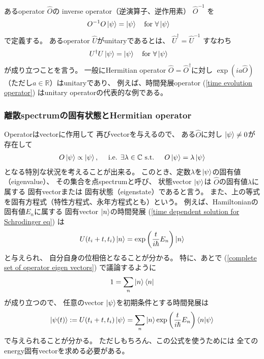 あるoperator $\hat{O}$の
inverse operator（逆演算子、逆作用素）
$\hat{O}^{-1}$
を
\begin{align}
    O^{-1} O \ket{\psi} &= \ket{\psi}
    \quad\text{for $\forall \ket{\psi}$}
\end{align}
で定義する。
あるoperator $\hat{U}$がunitaryであるとは、
$ \hat{U}^\dagger = \hat{U}^{-1} $
すなわち
\begin{align}
    U^\dagger U \ket{\psi} &= \ket{\psi}
    \quad\text{for $\forall \ket{\psi}$}
\label{unitary operator}
\end{align}
が成り立つことを言う。
一般にHermitian operator $\hat{O} = \hat{O}^\dagger$に対し
$\exp( i a \hat{O})$（ただし$a \in \mathbb{R}$）はunitaryであり、
例えば、時間発展operator
(\ref{time evolution operator})
はunitary operatorの代表的な例である。

\subsubsection{離散spectrumの固有状態とHermitian operator}

Operatorはvectorに作用して
再びvectorを与えるので、
ある$\hat{O}$に対し
$\ket{\psi} \neq 0$が存在して
\begin{align}
    O\ket{\psi} \propto \ket{\psi}
,\quad\text{
    i.e.
    $\exists \lambda\in\mathbb{C}$
    s.t.
}\quad
    O\ket{\psi} = \lambda \ket{\psi}
\end{align}
となる特別な状況を考えることが出来る。
このとき、定数$\lambda$を$\ket{\psi}$の固有値（eigenvalue）、
その集合を点spectrumと呼び、
状態vector $\ket{\psi}$は
$\hat{O}$の固有値$\lambda$に属する
固有vectorまたは
固有状態（eigenstate）であると言う。
また、上の等式を固有方程式（特性方程式、永年方程式とも）という。
例えば、Hamiltonianの固有値$E_n$に属する
固有vector $\ket{n}$の時間発展
(\ref{time dependent solution for Schrodinger eq})
は
\begin{align}
    U(t_i + t, t_i) \ket{n}
    =
    \exp\left(
        \dfrac{t}{i\hbar} E_n
    \right)
    \ket{n}
\end{align}
と与えられ、
自分自身の位相倍となることが分かる。
特に、あとで
(\ref{complete set of operator eigen vectors})
で議論するように
\begin{align}
    1 = \sum_n \ket{n} \bra{n}
\end{align}
が成り立つので、
任意のvector $\ket{\psi}$を初期条件とする時間発展は
\begin{align}
    \ket{\psi(t)}
    :=
    U(t_i + t, t_i)
    \ket{\psi}
    =
    \sum_n \ket{n}
    \exp\left(
        \dfrac{t}{i\hbar} E_n
    \right)
    \braket{ n | \psi }
\label{eigen decomposition of time independent solution}
\end{align}
で与えられることが分かる。
ただしもちろん、この公式を使うためには
全てのenergy固有vectorを求める必要がある。


